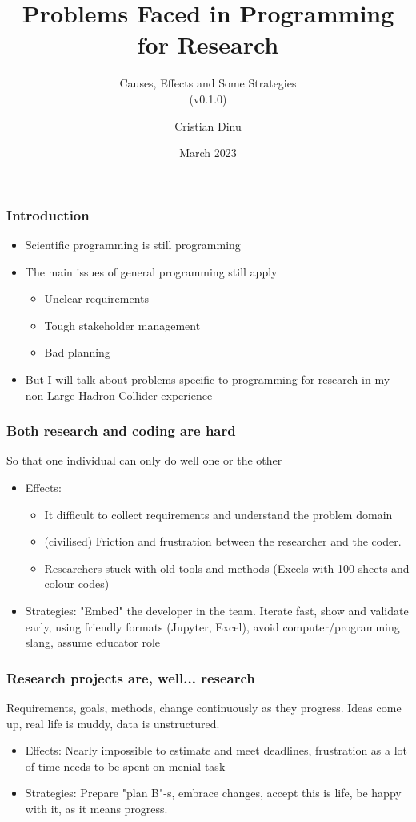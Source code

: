 \documentclass[14pt, aspectratio=169]{beamer}
\title{Problems Faced in Programming for Research}
\subtitle{Causes, Effects and Some Strategies\\
\scriptsize (v0.1.0)}
\author{Cristian Dinu}
\date{March 2023}
\begin{document}
\frame{\titlepage}

\begin{frame}
\frametitle{Introduction}
\begin{itemize}
\item Scientific programming is still programming
\item The main issues of general programming still apply
    \begin{itemize}
    \item Unclear requirements
    \item Tough stakeholder management
    \item Bad planning
    \end{itemize}
\item But I will talk about problems specific to programming for research in my non-Large Hadron Collider experience
\end{itemize}

\end{frame}

\begin{frame}
\frametitle{Both research and coding are hard}
So that one individual can only do well one or the other
\begin{itemize}
\item Effects:
    \begin{itemize}
        \item It difficult to collect requirements and understand the problem domain
        \item (civilised) Friction and frustration between the researcher and the coder.
        \item Researchers stuck with old tools and methods (Excels with 100 sheets and colour codes)
    \end{itemize}
\item Strategies: "Embed" the developer in the team. Iterate fast, show and validate early, using friendly formats (Jupyter, Excel), avoid computer/programming slang, assume educator role
\end{itemize}
\end{frame}

\begin{frame}
\frametitle{Research projects are, well... research}
Requirements, goals, methods, change continuously as they progress. Ideas come up, real life is muddy, data is unstructured. 
\begin{itemize}
\item Effects: Nearly impossible to estimate and meet deadlines, frustration as a lot of time needs to be spent on menial task
\item Strategies: Prepare "plan B"-s, embrace changes, accept this is life, be happy with it, as it means progress.
\end{itemize}
\end{frame}
\end{document}
